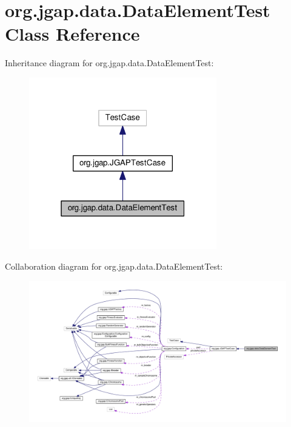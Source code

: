 \hypertarget{classorg_1_1jgap_1_1data_1_1_data_element_test}{\section{org.\-jgap.\-data.\-Data\-Element\-Test Class Reference}
\label{classorg_1_1jgap_1_1data_1_1_data_element_test}
}


Inheritance diagram for org.\-jgap.\-data.\-Data\-Element\-Test\-:
\nopagebreak
\begin{figure}[H]
\begin{center}
\leavevmode
\includegraphics[width=232pt]{classorg_1_1jgap_1_1data_1_1_data_element_test__inherit__graph}
\end{center}
\end{figure}


Collaboration diagram for org.\-jgap.\-data.\-Data\-Element\-Test\-:
\nopagebreak
\begin{figure}[H]
\begin{center}
\leavevmode
\includegraphics[width=350pt]{classorg_1_1jgap_1_1data_1_1_data_element_test__coll__graph}
\end{center}
\end{figure}
